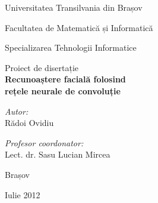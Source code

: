 \pagestyle{empty}

\begin{titlepage}

\begin{center}

\Large Universitatea Transilvania din Brașov

\Large Facultatea de Matematică și Informatică

\large Specializarea Tehnologii Informatice

\vfill
\Large Proiect de disertație\\[0.3cm]
 
{ \Huge \bfseries Recunoaștere facială folosind \\ rețele neurale de convoluție}\\[2cm]
 
\begin{minipage}{0.4\textwidth}
\begin{flushleft} \large
\emph{Autor:}\\
Rădoi Ovidiu
\end{flushleft}
\end{minipage}
\begin{minipage}{0.5\textwidth}
\begin{flushright} \large
\emph{Profesor coordonator:} \\
Lect. dr. Sasu Lucian Mircea
\end{flushright}
\end{minipage}
 
\vfill

{\Large Brașov}

{\large Iulie 2012}
 
\end{center}
 
\end{titlepage}
\pagestyle{fancy}